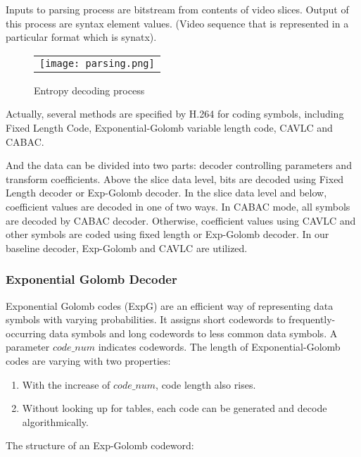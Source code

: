 \documentclass[../main.tex]{subfiles}
\begin{document}
Inputs to parsing process are bitstream from contents of video slices. Output of this process are syntax element values. (Video sequence that is represented in a particular format which is synatx).

\begin{figure} [ht]
\begin{center}
\begin{tabular}{c} %
\texttt{[image: parsing.png]}
\end{tabular}
\end{center}
\caption[parsing] 
{ \label{fig:parsing} Entropy decoding process}
\end{figure} 

Actually, several methods are specified by H.264 for coding symbols, including Fixed Length Code, Exponential-Golomb variable length code, CAVLC and CABAC. 

And the data can be divided into two parts: decoder controlling parameters and transform coefficients. Above the slice data level, bits are decoded using Fixed Length decoder or Exp-Golomb decoder. In the slice data level and below, coefficient values are decoded in one of two ways. In CABAC mode, all symbols are decoded by CABAC decoder. Otherwise, coefficient values using CAVLC and other symbols are coded using fixed length or Exp-Golomb decoder. In our baseline decoder, Exp-Golomb and CAVLC are utilized.

\subsubsection{ Exponential Golomb Decoder }

Exponential Golomb codes (ExpG) are an efficient way of representing data symbols with varying probabilities. It assigns short codewords to frequently-occurring data symbols and long codewords to less common data symbols. A parameter $code\_num$ indicates codewords. The length of Exponential-Golomb codes are varying with two properties:

\begin{enumerate}
\item With the increase of $code\_num$, code length also rises.
\item Without looking up for tables, each code can be generated and decode algorithmically. 
\end{enumerate}

The structure of an Exp-Golomb codeword:
\end{document}
